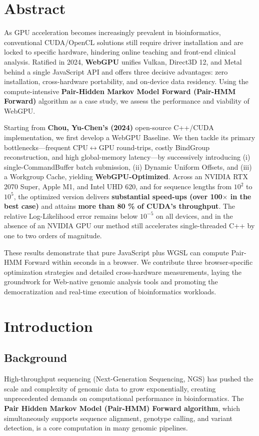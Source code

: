 \documentclass[12pt]{report}
\begin{document}
\chapter{Abstract}
As GPU acceleration becomes increasingly prevalent in bioinformatics, conventional CUDA/OpenCL solutions still require driver installation and are locked to specific hardware, hindering online teaching and front-end clinical analysis. Ratified in 2024, \textbf{WebGPU} unifies Vulkan, Direct3D 12, and Metal behind a single JavaScript API and offers three decisive advantages: zero installation, cross-hardware portability, and on-device data residency. Using the compute-intensive \textbf{Pair-Hidden Markov Model Forward (Pair-HMM Forward)} algorithm as a case study, we assess the performance and viability of WebGPU.

Starting from \textbf{Chou, Yu-Chen’s (2024)} open-source C++/CUDA implementation, we first develop a WebGPU Baseline. We then tackle its primary bottlenecks—frequent CPU$\leftrightarrow$GPU round-trips, costly BindGroup reconstruction, and high global-memory latency—by successively introducing (i) single-CommandBuffer batch submission, (ii) Dynamic Uniform Offsets, and (iii) a Workgroup Cache, yielding \textbf{WebGPU-Optimized}. Across an NVIDIA RTX 2070 Super, Apple M1, and Intel UHD 620, and for sequence lengths from $10^2$ to $10^5$, the optimized version delivers \textbf{substantial speed-ups (over 100$\times$ in the best case)} and attains \textbf{more than 80 \% of CUDA’s throughput}. The relative Log-Likelihood error remains below $10^{-5}$ on all devices, and in the absence of an NVIDIA GPU our method still accelerates single-threaded C++ by one to two orders of magnitude.

These results demonstrate that pure JavaScript plus WGSL can compute Pair-HMM Forward within seconds in a browser. We contribute three browser-specific optimization strategies and detailed cross-hardware measurements, laying the groundwork for Web-native genomic analysis tools and promoting the democratization and real-time execution of bioinformatics workloads.

\chapter{Introduction}
\section{Background}
High-throughput sequencing (Next-Generation Sequencing, NGS) has pushed the scale and complexity of genomic data to grow exponentially, creating unprecedented demands on computational performance in bioinformatics. The \textbf{Pair Hidden Markov Model (Pair-HMM) Forward algorithm}, which simultaneously supports sequence alignment, genotype calling, and variant detection, is a core computation in many genomic pipelines.
\end{document}
